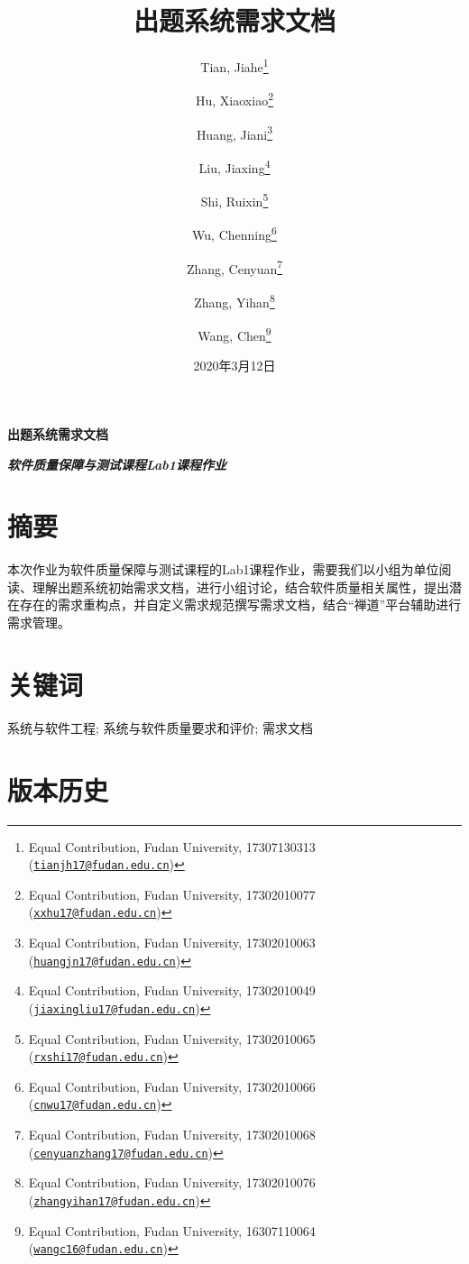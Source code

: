 \documentclass[hyperref, a4paper]{ctexart}
\title{\vspace{2in} 出题系统需求文档\\\vspace{0.5em}{\large 软件质量保障与测试课程Lab1课程作业（第9组）}}
\author{Tian, Jiahe\footnote{Equal Contribution, Fudan University, 17307130313
  (\href{mailto:tianjh17@fudan.edu.cn}{\nolinkurl{tianjh17@fudan.edu.cn}})} \and Hu, Xiaoxiao\footnote{Equal Contribution, Fudan University, 17302010077
  (\href{mailto:xxhu17@fudan.edu.cn}{\nolinkurl{xxhu17@fudan.edu.cn}})} \and Huang, Jiani\footnote{Equal Contribution, Fudan University, 17302010063
  (\href{mailto:huangjn17@fudan.edu.cn}{\nolinkurl{huangjn17@fudan.edu.cn}})} \and Liu, Jiaxing\footnote{Equal Contribution, Fudan University, 17302010049
  (\href{mailto:jiaxingliu17@fudan.edu.cn}{\nolinkurl{jiaxingliu17@fudan.edu.cn}})} \and Shi, Ruixin\footnote{Equal Contribution, Fudan University, 17302010065
  (\href{mailto:rxshi17@fudan.edu.cn}{\nolinkurl{rxshi17@fudan.edu.cn}})} \and Wu, Chenning\footnote{Equal Contribution, Fudan University, 17302010066
  (\href{mailto:cnwu17@fudan.edu.cn}{\nolinkurl{cnwu17@fudan.edu.cn}})} \and Zhang, Cenyuan\footnote{Equal Contribution, Fudan University,
  17302010068
  (\href{mailto:cenyuanzhang17@fudan.edu.cn}{\nolinkurl{cenyuanzhang17@fudan.edu.cn}})} \and Zhang, Yihan\footnote{Equal Contribution, Fudan University, 17302010076
  (\href{mailto:zhangyihan17@fudan.edu.cn}{\nolinkurl{zhangyihan17@fudan.edu.cn}})} \and Wang, Chen\footnote{Equal Contribution, Fudan University, 16307110064
  (\href{mailto:wangc16@fudan.edu.cn}{\nolinkurl{wangc16@fudan.edu.cn}})}}
\date{2020年3月12日}
\begin{document}
\maketitle

\newpage

\LARGE

\begin{center}
\textbf{出题系统需求文档}
\end{center}

\large
\begin{center}
\textbf{\emph{软件质量保障与测试课程Lab1课程作业}}
\end{center}

\hypertarget{ux6458ux8981}{%
\section*{摘要}\label{ux6458ux8981}}

本次作业为软件质量保障与测试课程的Lab1课程作业，需要我们以小组为单位阅读、理解出题系统初始需求文档，进行小组讨论，结合软件质量相关属性，提出潜在存在的需求重构点，并自定义需求规范撰写需求文档，结合``禅道''平台辅助进行需求管理。

\hypertarget{ux5173ux952eux8bcd}{%
\section*{关键词}\label{ux5173ux952eux8bcd}}

系统与软件工程; 系统与软件质量要求和评价; 需求文档

\hypertarget{ux7248ux672cux5386ux53f2}{%
\section*{版本历史}\label{ux7248ux672cux5386ux53f2}}
\end{document}
